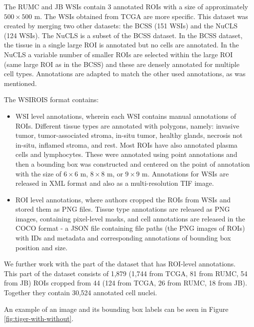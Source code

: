 The RUMC and JB WSIs contain 3 annotated ROIs with a size of approximately $500\!\times\!500$ \textmu m. The WSIs obtained from TCGA are more specific. This dataset was created by merging two other datasets: the BCSS (151 WSIs) and the NuCLS (124 WSIs). The NuCLS is a subset of the BCSS dataset. In the BCSS dataset, the tissue in a single large ROI is annotated but no cells are annotated. In the NuCLS a variable number of smaller ROIs are selected within the large ROI (same large ROI as in the BCSS) and these are densely annotated for multiple cell types. Annotations are adapted to match the other used annotations, as was mentioned.

The WSIROIS format contains:

\begin{itemize}
    \item WSI level annotations, wherein each WSI contains manual annotations of ROIs. Different tissue types are annotated with polygons, namely: invasive tumor, tumor-associated stroma, in-situ tumor, healthy glands, necrosis not in-situ, inflamed stroma, and rest. Most ROIs have also annotated plasma cells and lymphocytes. These were annotated using point annotations and then a bounding box was constructed and centered on the point of annotation with the size of $6\!\times\!6$ \textmu m, $8\!\times\!8$ \textmu m, or $9\!\times\!9$ \textmu m. Annotations for WSIs are released in XML format and also as a multi-resolution TIF image.
    \item ROI level annotations, where authors cropped the ROIs from WSIs and stored them as PNG files. Tissue type annotations are released as PNG images, containing pixel-level masks, and cell annotations are released in the COCO format - a JSON file containing file paths (the PNG images of ROIs) with IDs and metadata and corresponding annotations of bounding box position and size.
\end{itemize}

We further work with the part of the dataset that has ROI-level annotations. This part of the dataset consists of 1,879 (1,744 from TCGA, 81 from RUMC, 54 from JB) ROIs cropped from 44 (124 from TCGA, 26 from RUMC, 18 from JB). Together they contain 30,524 annotated cell nuclei.

An example of an image and its bounding box labels can be seen in Figure \ref{fig:tiger-with-without}.

